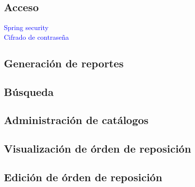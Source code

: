 \subsection{Acceso}
\textcolor{blue}{Spring security}\\
\textcolor{blue}{Cifrado de contraseña}\\
\subsection{Generación de reportes}
\subsection{Búsqueda}

\subsection{Administración de catálogos}

\subsection{Visualización de órden de reposición}

\subsection{Edición de órden de reposición}














